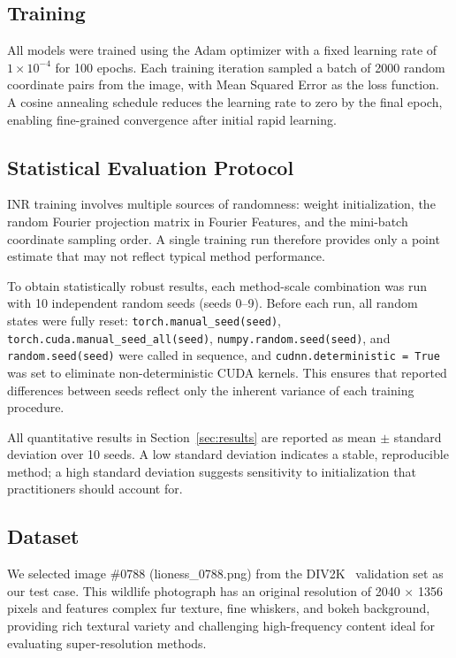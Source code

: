 \documentclass[a4paper,oneside,10pt,ngerman,english]{scrartcl}
\begin{document}
\subsection{Training}

All models were trained using the Adam optimizer with a fixed learning rate of $1 \times 10^{-4}$ for 100 epochs. Each training iteration sampled a batch of 2000 random coordinate pairs from the image, with Mean Squared Error as the loss function. A cosine annealing schedule reduces the learning rate to zero by the final epoch, enabling fine-grained convergence after initial rapid learning.

\subsection{Statistical Evaluation Protocol}
\label{subsec:seeds}

INR training involves multiple sources of randomness: weight initialization, the random Fourier projection matrix in Fourier Features, and the mini-batch coordinate sampling order. A single training run therefore provides only a point estimate that may not reflect typical method performance.

To obtain statistically robust results, each method-scale combination was run with 10 independent random seeds (seeds 0--9). Before each run, all random states were fully reset: \texttt{torch.manual\_seed(seed)}, \texttt{torch.cuda.manual\_seed\_all(seed)}, \texttt{numpy.random.seed(seed)}, and \texttt{random.seed(seed)} were called in sequence, and \texttt{cudnn.deterministic = True} was set to eliminate non-deterministic CUDA kernels. This ensures that reported differences between seeds reflect only the inherent variance of each training procedure.

All quantitative results in Section~\ref{sec:results} are reported as mean $\pm$ standard deviation over 10 seeds. A low standard deviation indicates a stable, reproducible method; a high standard deviation suggests sensitivity to initialization that practitioners should account for.

\cleardoubleoddpage
\subsection{Dataset}

We selected image \#0788 (lioness\_0788.png) from the DIV2K~\cite{agustsson2017div2k} validation set as our test case. This wildlife photograph has an original resolution of 2040 $\times$ 1356 pixels and features complex fur texture, fine whiskers, and bokeh background, providing rich textural variety and challenging high-frequency content ideal for evaluating super-resolution methods.
\end{document}

